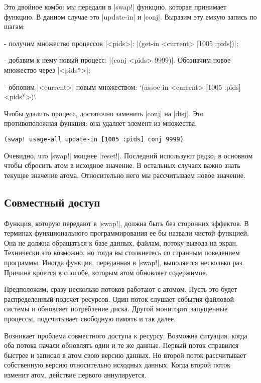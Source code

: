 Это двойное комбо: мы передали в \spverb|swap!| функцию, которая принимает функцию. В
данном случае это \spverb|update-in| и \spverb|conj|. Выразим эту емкую запись по шагам:

- получим множество процессов \spverb|<pids>|: \spverb|(get-in <current> [1005 :pids])|;

- добавим к нему новый процесс: \spverb|(conj <pids> 9999)|. Обозначим новое множество
  через \spverb|<pids*>|;

- обновим \spverb|<current>| новым множеством: `(assoc-in <current> [1005 :pids]
  <pids*>)`.

Чтобы удалить процесс, достаточно заменить \spverb|conj| на \spverb|disj|. Это противоположная
функция: она удаляет элемент из множества.

\begin{verbatim}
(swap! usage-all update-in [1005 :pids] conj 9999)
\end{verbatim}

Очевидно, что \spverb|swap!| мощнее \spverb|reset!|. Последний используют редко, в основном
чтобы сбросить атом в исходное значение. В остальных случаях важно знать текущее
значение атома. Относительно него мы рассчитываем новое значение.

\subsection{Совместный доступ}

Функция, которую передают в \spverb|swap!|, должна быть без сторонних эффектов. В
терминах функционального программирования ее бы назвали чистой функцией. Она не
должна обращаться к базе данных, файлам, потоку вывода на экран. Технически это
возможно, но тогда вы столкнетесь со странным поведением программы. Иногда
функция, переданная в \spverb|swap!|, выполяется несколько раз. Причина кроется в
способе, которым атом обновляет содержимое.

Предположим, сразу несколько потоков работают с атомом. Пусть это будет
распределенный подсчет ресурсов. Один поток слушает события файловой системы и
обновляет потребление диска. Другой мониторит запущенные процессы, подсчитывает
свободную память и так далее.

Возникает проблема совместного доступа к ресурсу. Возможна ситуация, когда оба
потока начали обновлять одни и те же данные. Первый поток справился быстрее и
записал в атом свою версию данных. Но второй поток рассчитывает собственную
версию относительно исходных данных. Когда второй поток изменит атом, действие
первого аннулируется.

